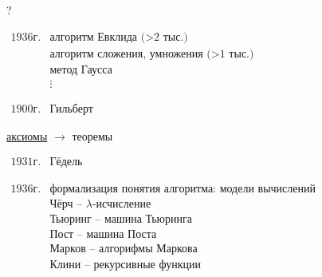 

\begin{note}[История]
    ?

    $ \begin{array}{ll}
            \boxed{1936\text{г.}} & \text{алгоритм Евклида (>2 тыс.)}             \\
                                  & \text{алгоритм сложения, умножения (>1 тыс.)} \\
                                  & \text{метод Гаусса}                           \\
                                  & \vdots
        \end{array} $

    $ \begin{array}{ll}
            \boxed{1900\text{г.}} & \text{Гильберт}
        \end{array} $

    \begin{center}
        \underline{аксиомы} $ \longrightarrow $ теоремы
    \end{center}

    $ \begin{array}{ll}
            \boxed{1931\text{г.}} & \text{Гёдель}
        \end{array} $

    $ \begin{array}{ll}
            \boxed{1936\text{г.}} & \text{формализация понятия алгоритма: модели вычислений} \\
                                  & \text{Чёрч -- }\lambda\text{-исчисление}                 \\
                                  & \text{Тьюринг -- машина Тьюринга}                        \\
                                  & \text{Пост -- машина Поста}                              \\
                                  & \text{Марков -- алгорифмы Маркова}                       \\
                                  & \text{Клини -- рекурсивные функции}
        \end{array} $


\end{note}
